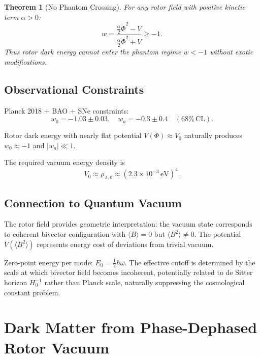 \documentclass[11pt,a4paper]{article}
\numberwithin{equation}{section}
\theoremstyle{plain}
\newtheorem{theorem}{Theorem}[section]
\theoremstyle{definition}
\theoremstyle{remark}
\begin{document}
\begin{theorem}[No Phantom Crossing]
For any rotor field with positive kinetic term $\alpha > 0$:
\begin{equation}
w = \frac{\frac{\alpha}{2}\dot{\Phi}^2 - V}{\frac{\alpha}{2}\dot{\Phi}^2 + V} \geq -1.
\end{equation}
Thus rotor dark energy cannot enter the phantom regime $w < -1$ without exotic modifications.
\end{theorem}

\subsection{Observational Constraints}

Planck 2018 + BAO + SNe constraints:
\begin{equation}
w_0 = -1.03 \pm 0.03, \quad w_a = -0.3 \pm 0.4 \quad (68\%\,\mathrm{CL}).
\end{equation}

Rotor dark energy with nearly flat potential $V(\Phi) \approx V_0$ naturally produces $w_0 \approx -1$ and $|w_a| \ll 1$.

The required vacuum energy density is
\begin{equation}
V_0 \approx \rho_{\Lambda,0} \approx (2.3 \times 10^{-3}\,\mathrm{eV})^4.
\label{eq:vacuum-scale}
\end{equation}

\subsection{Connection to Quantum Vacuum}

The rotor field provides geometric interpretation: the vacuum state corresponds to coherent bivector configuration with $\langle B \rangle = 0$ but $\langle B^2 \rangle \neq 0$. The potential $V(\langle B^2 \rangle)$ represents energy cost of deviations from trivial vacuum.

Zero-point energy per mode: $E_0 = \frac{1}{2}\hbar\omega$. The effective cutoff is determined by the scale at which bivector field becomes incoherent, potentially related to de Sitter horizon $H_0^{-1}$ rather than Planck scale, naturally suppressing the cosmological constant problem.

\section{Dark Matter from Phase-Dephased Rotor Vacuum}
\label{sec:dark-matter}
\end{document}
